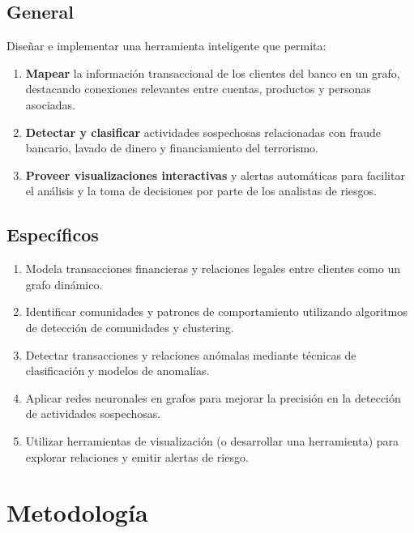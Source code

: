 \subsection{General}
Diseñar e implementar una herramienta inteligente que permita:
\begin{enumerate}
    \item \textbf{Mapear} la información transaccional de los clientes del banco en un grafo, destacando conexiones relevantes entre cuentas, productos y personas asociadas.
    \item \textbf{Detectar y clasificar} actividades sospechosas relacionadas con fraude bancario, lavado de dinero y financiamiento del terrorismo.
    \item \textbf{Proveer visualizaciones interactivas} y alertas automáticas para facilitar el análisis y la toma de decisiones por parte de los analistas de riesgos.
\end{enumerate}

\subsection{Específicos}
\begin{enumerate}
    \item Modela transacciones financieras y relaciones legales entre clientes como un grafo dinámico.
    \item Identificar comunidades y patrones de comportamiento utilizando algoritmos de detección de comunidades y clustering.
    \item Detectar transacciones y relaciones anómalas mediante técnicas de clasificación y modelos de anomalías.
    \item Aplicar redes neuronales en grafos para mejorar la precisión en la detección de actividades sospechosas.
    \item Utilizar herramientas de visualización (o desarrollar una herramienta) para explorar relaciones y emitir alertas de riesgo.
\end{enumerate}


\section{Metodología}
